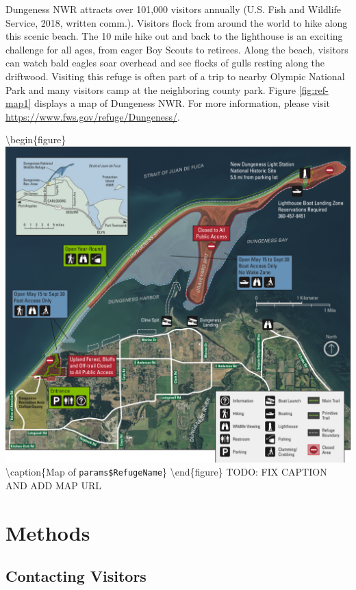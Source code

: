 \documentclass[]{book}
\begin{document}
Dungeness NWR attracts over 101,000 visitors annually (U.S. Fish and
Wildlife Service, 2018, written comm.). Visitors flock from around the
world to hike along this scenic beach. The 10 mile hike out and back to
the lighthouse is an exciting challenge for all ages, from eager Boy
Scouts to retirees. Along the beach, visitors can watch bald eagles soar
overhead and see flocks of gulls resting along the driftwood. Visiting
this refuge is often part of a trip to nearby Olympic National Park and
many visitors camp at the neighboring county park. Figure
\ref{fig:ref-map1} displays a map of Dungeness NWR. For more
information, please visit \url{https://www.fws.gov/refuge/Dungeness/}.

\textbackslash{}begin\{figure\}
\includegraphics[width=19.29in]{refuge-info/Dungeness National Wildlife Refuge/map}
\textbackslash{}caption\{Map of
\texttt{params\$RefugeName}\}\label{fig:ref-map1}
\textbackslash{}end\{figure\} TODO: FIX CAPTION AND ADD MAP URL

\chapter{Methods}\label{methods}

\section*{Contacting Visitors}\label{contacting-visitors}
\end{document}
